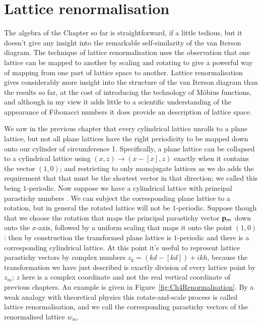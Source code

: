 \section{Lattice renormalisation}
The algebra of the Chapter so far is straightforward, if a little tedious, but it doesn't give any insight into the remarkable self-similarity of the van Iterson diagram. The technique of lattice renormalisation uses the observation that one lattice can be mapped to another by scaling and rotating to give a powerful way of mapping from one part of lattice space to another. Lattice renormalisation gives considerably more insight into the structure of the van Iterson diagram than the results so far, at the cost of introducing the technology of M{\"obius} functions, and although in my view it adds little to a scientific understanding of the appearance of Fibonacci numbers it does provide an   description of lattice space.
\label{sec:levitov}

We saw in the previous chapter that every cylindrical lattice unrolls to a plane lattice, but not all plane lattices have the right periodicity to be mapped down onto our cylinder of circumference 1. Specifically, a plane lattice can be collapsed to a cylindrical lattice using $(x,z)\rightarrow(x-\left[x\right],z)$ exactly when it contains the vector $(1,0)$; and restricting to only monojugate lattices as we do adds the requirement that that must be the shortest vector in that direction; we called this being $1$-periodic. 
Now suppose we have a cylindrical lattice with principal parastichy numbers . We can subject the corresponding plane lattice to a rotation, but in general the rotated lattice will not be $1$-periodic. Suppose though that we choose the rotation that maps the principal parastichy vector ${\mathbf p}_{m}$ down onto the $x$-axis, followed by a uniform scaling that maps it onto the point $(1,0)$: then by construction the transformed plane lattice is $1$-periodic and there is a corresponding cylindrical lattice. At this point it's useful to represent lattice parastichy vectors by complex numbers $z_k=(kd-[kd])+i kh$, because the transformation we have just described is exactly division of every lattice point by $z_m$; $z$ here is a complex coordinate and not the real vertical coordinate of previous chapters. 
 An example is given in Figure~\ref{fig:Ch4Renormalisation}. By a weak analogy with theoretical physics this rotate-and-scale process is called lattice renormalisation, and we call the corresponding parastichy vectors of the renormalised lattice $w_m$.

